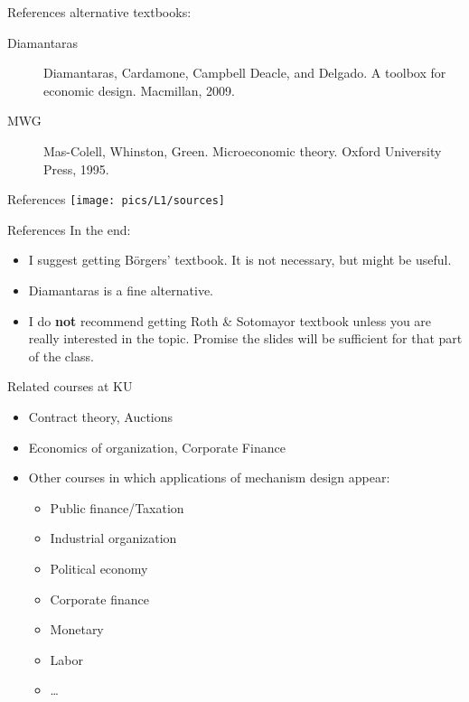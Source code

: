 \documentclass[english,10pt
,aspectratio=169
]{beamer}
\begin{document}
\begin{frame}{References}
	alternative textbooks:
	\begin{description}
		\item[Diamantaras] Diamantaras, Cardamone, Campbell Deacle, and Delgado. A toolbox for economic design. Macmillan, 2009.
		\item[MWG] Mas-Colell,  Whinston, Green. Microeconomic theory. Oxford University Press, 1995. 
	\end{description}
\end{frame}


\begin{frame}{References}
	\texttt{[image: pics/L1/sources]}
\end{frame}


\begin{frame}{References}
	In the end:
	\begin{itemize}
		\item I suggest getting B{\"o}rgers' textbook. It is not necessary, but might be useful.
		\item Diamantaras is a fine alternative.
		\item I do \textbf{not} recommend getting Roth \& Sotomayor textbook unless you are really interested in the topic. Promise the slides will be sufficient for that part of the class.
	\end{itemize}
\end{frame}


\begin{frame}{Related courses at KU}
\begin{itemize}
	\item Contract theory, Auctions
	\item Economics of organization, Corporate Finance
	\item Other courses in which applications of mechanism design appear:
	\begin{itemize}
		\item Public finance/Taxation
		\item Industrial organization
		\item Political economy
		\item Corporate finance
		\item Monetary
		\item Labor
		\item \ldots{}
	\end{itemize}
\end{itemize}
\end{frame}
\end{document}
